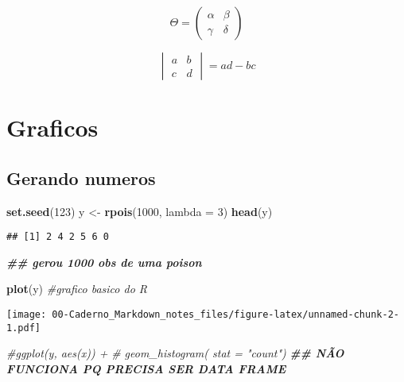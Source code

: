 \documentclass[
]{article}
\newenvironment{Shaded}{\begin{snugshade}}{\end{snugshade}}
\newcommand{\AttributeTok}[1]{\textcolor[rgb]{0.13,0.29,0.53}{#1}}
\newcommand{\CommentTok}[1]{\textcolor[rgb]{0.56,0.35,0.01}{\textit{#1}}}
\newcommand{\DecValTok}[1]{\textcolor[rgb]{0.00,0.00,0.81}{#1}}
\newcommand{\DocumentationTok}[1]{\textcolor[rgb]{0.56,0.35,0.01}{\textbf{\textit{#1}}}}
\newcommand{\FunctionTok}[1]{\textcolor[rgb]{0.13,0.29,0.53}{\textbf{#1}}}
\newcommand{\NormalTok}[1]{#1}
\newcommand{\OtherTok}[1]{\textcolor[rgb]{0.56,0.35,0.01}{#1}}
\begin{document}
\[\Theta = \begin{pmatrix}\alpha & \beta\\
\gamma & \delta
\end{pmatrix}\]

\[\begin{vmatrix}a & b\\
c & d
\end{vmatrix}=ad-bc\]

\section{Graficos}\label{graficos}

\subsection{Gerando numeros}\label{gerando-numeros}

\begin{Shaded}
\begin{Highlighting}[]
\FunctionTok{set.seed}\NormalTok{(}\DecValTok{123}\NormalTok{)}
\NormalTok{y }\OtherTok{\textless{}{-}} \FunctionTok{rpois}\NormalTok{(}\DecValTok{1000}\NormalTok{, }\AttributeTok{lambda =} \DecValTok{3}\NormalTok{)}
\FunctionTok{head}\NormalTok{(y)}
\end{Highlighting}
\end{Shaded}

\begin{verbatim}
## [1] 2 4 2 5 6 0
\end{verbatim}

\begin{Shaded}
\begin{Highlighting}[]
\DocumentationTok{\#\# gerou 1000 obs de uma poison}
\end{Highlighting}
\end{Shaded}

\begin{Shaded}
\begin{Highlighting}[]
\FunctionTok{plot}\NormalTok{(y) }\CommentTok{\#grafico basico do R}
\end{Highlighting}
\end{Shaded}

\texttt{[image: 00-Caderno\_Markdown\_notes\_files/figure-latex/unnamed-chunk-2-1.pdf]}

\begin{Shaded}
\begin{Highlighting}[]
\CommentTok{\#ggplot(y, aes(x)) + }
\CommentTok{\#  geom\_histogram( stat = "count")}
\DocumentationTok{\#\# NÃO FUNCIONA PQ PRECISA SER DATA FRAME}
\end{Highlighting}
\end{Shaded}
\end{document}
